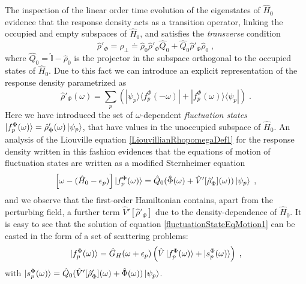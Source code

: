 \documentclass[reprint,aps,prb]{revtex4-1}
\newcommand{\eps}{\epsilon}
\newcommand{\be}{\begin{equation}}
\newcommand{\ee}{\end{equation}}
\newcommand{\lb}{\label}
\newcommand{\op}[1]{\hat {#1}}
\newcommand{\ketbra}[2]{| #1 \rangle \langle #2 |}
\newcommand{\dmnot}{\op{\rho}_0}
\newcommand{\dm}{\op{\rho}}
\newcommand{\hnot}{\op{H}_0}
\newcommand{\identity}{\op{\mathbb I}}
\begin{document}
The inspection of the linear order time evolution of the eigenstates of $\hnot$ evidence that the response density acts as a transition 
operator, linking the occupied and empty subspaces of $\hnot$, and satisfies the \emph{transverse} condition  
\be\lb{RhopTransverseDef1}
\dm'_\Phi = \dm_{\perp} \doteq \dmnot\dm'_\Phi\op Q_0 + \op Q_0\dm'_\Phi\dmnot \;,
\ee
where $\op Q_0=\identity-\dmnot$ is the projector in the subspace orthogonal to the occupied states of $\hnot$. 
Due to this fact we can introduce an explicit representation of the 
response density parametrized as
\be\lb{rhoPrimeFluctuationStateDef1}
\dm'_\Phi(\omega) = \sum_p\left(\ketbra{\psi_p}{f_p^\Phi(-\omega)} + \ketbra{f_p^\Phi(\omega)}{\psi_p}\right) \;.
\ee
Here we have introduced the set of $\omega$-dependent \emph{fluctuation states} 
$\ket{f_p^\Phi(\omega)} = \dm'_\Phi(\omega) \ket{\psi_p}$, that have values in the unoccupied subspace of $\hnot$. 
An analysis of the Liouville equation \eqref{LiouvillianRhopomegaDef1} for the response density written in this fashion evidences that the equations of motion of fluctuation states are 
written as a modified Sternheimer equation~\cite{mahan1980,giustino2012,giustino2014}
\be\lb{fluctuationStateEqMotion1}
\left[\omega - (\hnot-\eps_p)\right]\ket{f_p^\Phi(\omega)} = \op Q_0(\op\Phi(\omega)+\op V'[\dm'_\Phi](\omega))\ket{\psi_p} \;,
\ee
and we observe that the first-order Hamiltonian contains, 
apart from the perturbing field, a further term $\op V'[\dm'_\Phi]$ due to the density-dependence of $\hnot$.
It is easy to see that the solution of equation \eqref{fluctuationStateEqMotion1} can be casted in the form of
a set of scattering problems:
\be\lb{rhoPrimeFluctuationStateDef2}
\ket{f_p^\Phi(\omega)} = \op G_H(\omega+\epsilon_p)\left(\op V\ket{f_p^\Phi(\omega)} + \ket{s_p^\Phi(\omega)} \right)\;,
\ee
with%
$%
\ket{s_p^\Phi(\omega)} = \op Q_0(\op V'[\dm'_\Phi](\omega) + \op \Phi(\omega))\ket{\psi_p}
$. %
\end{document}
